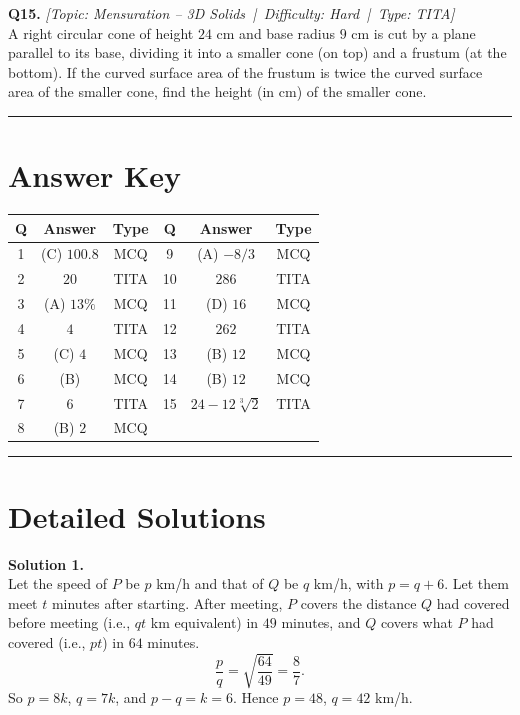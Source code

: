 \documentclass[11pt,a4paper]{article}
\newcommand{\qhead}[4]{\vspace{0.4em}\noindent\textbf{Q#1.} \textit{[Topic: #2 \,|\, Difficulty: #3 \,|\, Type: #4]}\\[0.15em]}
\newcommand{\shead}[1]{\vspace{0.5em}\noindent\textbf{Solution #1.}\\[0.15em]}
\begin{document}
\qhead{15}{Mensuration -- 3D Solids}{Hard}{TITA}
A right circular cone of height $24$ cm and base radius $9$ cm is cut by a plane parallel to its base, dividing it into a smaller cone (on top) and a frustum (at the bottom). If the curved surface area of the frustum is twice the curved surface area of the smaller cone, find the height (in cm) of the smaller cone.

\vspace{1em}
\hrule
\vspace{0.7em}

\section*{Answer Key}

\begin{center}
\begin{tabular}{|c|c|c|c|c|c|}
\hline
\textbf{Q} & \textbf{Answer} & \textbf{Type} & \textbf{Q} & \textbf{Answer} & \textbf{Type} \\
\hline
1 & (C) $100.8$ & MCQ & 9 & (A) $-8/3$ & MCQ \\
\hline
2 & $20$ & TITA & 10 & $286$ & TITA \\
\hline
3 & (A) $13\%$ & MCQ & 11 & (D) $16$ & MCQ \\
\hline
4 & $4$ & TITA & 12 & $262$ & TITA \\
\hline
5 & (C) $4$ & MCQ & 13 & (B) $12$ & MCQ \\
\hline
6 & (B) & MCQ & 14 & (B) $12$ & MCQ \\
\hline
7 & $6$ & TITA & 15 & $24 - 12\sqrt[3]{2}$ & TITA \\
\hline
8 & (B) $2$ & MCQ & & & \\
\hline
\end{tabular}
\end{center}

\vspace{0.5em}
\hrule
\vspace{0.7em}

\section*{Detailed Solutions}

\shead{1}
Let the speed of $P$ be $p$ km/h and that of $Q$ be $q$ km/h, with $p = q + 6$. Let them meet $t$ minutes after starting. After meeting, $P$ covers the distance $Q$ had covered before meeting (i.e., $qt$ km equivalent) in $49$ minutes, and $Q$ covers what $P$ had covered (i.e., $pt$) in $64$ minutes.
\[ \frac{p}{q} = \sqrt{\frac{64}{49}} = \frac{8}{7}. \]
So $p = 8k$, $q = 7k$, and $p - q = k = 6$. Hence $p = 48$, $q = 42$ km/h.
\end{document}
